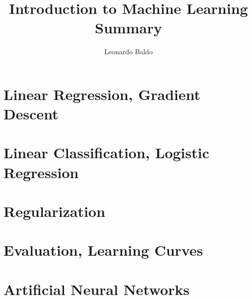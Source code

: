 \documentclass{article}
\title{Introduction to Machine Learning Summary}
\author{Leonardo Baldo}
\date{}
\begin{document}
\maketitle
\newpage

\tableofcontents
\newpage



\section{Linear Regression, Gradient Descent}
\newpage

\section{Linear Classification, Logistic Regression}
\newpage

\section{Regularization}
\newpage

\section{Evaluation, Learning Curves}
\newpage

\section{Artificial Neural Networks}
\newpage
\end{document}
